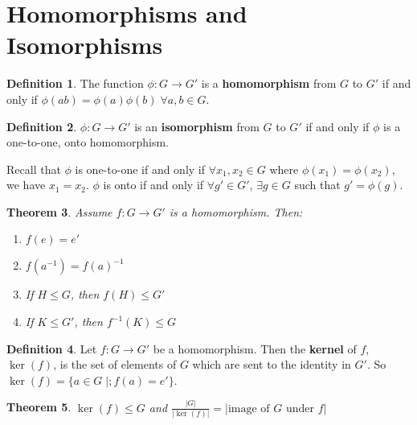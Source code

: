 \documentclass[11pt]{amsart}
\newtheorem{theorem}{Theorem}[section]
\theoremstyle{definition}
\newtheorem{definition}[theorem]{Definition}
\begin{document}
\section{Homomorphisms and Isomorphisms}
\begin{definition}
	The function $\phi: G \to G'$ is a \textbf{homomorphism} from $G$ to $G'$ if and only if $\phi(ab) = \phi(a)\phi(b) \; \forall a, b \in G$.
\end{definition}
\begin{definition}
	$\phi: G \to G'$ is an \textbf{isomorphism} from $G$ to $G'$ if and only if $\phi$ is a one-to-one, onto homomorphism.
\end{definition}
Recall that $\phi$ is one-to-one if and only if $\forall x_1, x_2 \in G$ where $\phi(x_1) = \phi(x_2)$, we have $x_1 = x_2$.
$\phi$ is onto if and only if $\forall g' \in G'$, $\exists g \in G$ such that $g' = \phi(g)$.
\begin{theorem}
	Assume $f: G \to G'$ is a homomorphism. Then:
	\begin{enumerate}
		\item{$f(e) = e'$}
		\item{$f(a^{-1}) = f(a)^{-1}$}
		\item{If $H \leq G$, then $f(H) \leq G'$}
		\item{If $K \leq G'$, then $f^{-1}(K) \leq G$}
	\end{enumerate}
\end{theorem}
\begin{definition}
	Let $f: G \to G'$ be a homomorphism. Then the \textbf{kernel} of $f$, $\ker(f)$, is the set of elements of $G$ which are sent to 
	the identity in $G'$. So $\ker(f) = \{ a \in G \; |; f(a) = e' \}$.
\end{definition}
\begin{theorem}
	$\ker(f) \leq G$ and $\frac{|G|}{| \ker(f) |} = | \text{image of $G$ under $f$} |$
\end{theorem}
\end{document}
